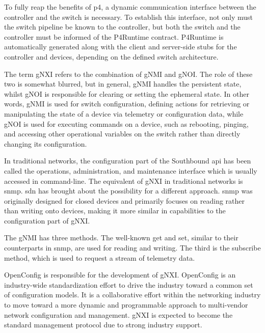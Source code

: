 To fully reap the benefits of \gls{p4}, a dynamic communication interface between the controller and the switch is necessary\cite{peterson_software-defined_2021}. To establish this interface, not only must the switch pipeline be known to the controller, but both the switch and the controller must be informed of the P4Runtime contract. P4Runtime is automatically generated along with the client and server-side stubs for the controller and devices, depending on the defined switch architecture\cite{peterson_software-defined_2021}.

The term gNXI refers to the combination of gNMI and gNOI. The role of these two is somewhat blurred, but in general, gNMI handles the persistent state, whilst gNOI is responsible for clearing or setting the ephemeral state. In other words, gNMI is used for switch configuration, defining actions for retrieving or manipulating the state of a device via telemetry or configuration data, while gNOI is used for executing commands on a device, such as rebooting, pinging, and accessing other operational variables on the switch rather than directly changing its configuration\cite{peterson_software-defined_2021}\cite{noauthor_openconfig_nodate}.

In traditional networks, the configuration part of the Southbound api has been called the operations, administration, and maintenance interface which is usually accessed in command-line\cite{peterson_software-defined_2021}. The equivalent of gNXI in traditional networks is \gls{snmp}. \gls{sdn} has brought about the possibility for a different approach. \gls{snmp} was originally designed for closed devices and primarily focuses on reading rather than writing onto devices, making it more similar in capabilities to the configuration part of gNXI\cite{peterson_software-defined_2021}.

The gNMI has three methods. The well-known get and set, similar to their counterparts in \gls{snmp}, are used for reading and writing. The third is the subscribe method, which is used to request a stream of telemetry data\cite{peterson_software-defined_2021}.

OpenConfig\cite{noauthor_openconfig_nodate} is responsible for the development of gNXI. OpenConfig is an industry-wide standardization effort to drive the industry toward a common set of configuration models. It is a collaborative effort within the networking industry to move toward a more dynamic and programmable approach to multi-vendor network configuration and management. gNXI is expected to become the standard management protocol due to strong industry support\cite{peterson_software-defined_2021}.

